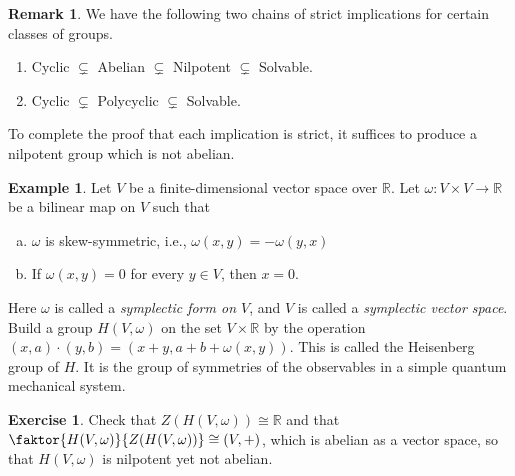 \documentclass[10pt,letterpaper,cm]{nupset}
\theoremstyle{definition}
\newtheorem{exmp}{Example}
\newtheorem{remark}{Remark}
\newtheorem{exercise}{Exercise}
\newcommand{\R}{\mathbb R}
\newcommand{\1}{\mathbf{1}}
\newcommand{\0}{\vec 0}
\begin{document}
\begin{remark} We have the following two chains of strict implications for certain classes of groups.
\begin{enumerate}
\item Cyclic $\subsetneq$ Abelian $\subsetneq$ Nilpotent $\subsetneq$ Solvable.
\item Cyclic $\subsetneq$ Polycyclic $\subsetneq$  Solvable.
\end{enumerate}
To complete the proof that each implication is strict, it suffices to produce a nilpotent group which is not abelian.

\end{remark}

\begin{exmp}
Let $V$ be a finite-dimensional vector space over $\R$. Let $\omega: V\times V\to \R$ be a bilinear map on $V$ such that
\begin{enumerate}[(a)]
\item $\omega$ is skew-symmetric, i.e., $\omega(x,y) = -\omega(y,x)$
\item If $\omega(x,y) =0$ for every $y \in V$, then $x=0$.
\end{enumerate}
Here $\omega$ is called a \textit{symplectic form on $V$}, and $V$ is called a \textit{symplectic vector space}. Build a group $H(V, \omega)$ on the set $V \times \R$ by the operation $(x,a)\cdot(y,b) = (x+y, a+b + \omega(x,y))$. This is called the Heisenberg group of $H$. It is the group of symmetries of the observables in a simple quantum mechanical system. 

\begin{exercise} 
Check that $Z(H(V, \omega)) \cong \R$ and that $\faktor{H(V, \omega)}{Z(H(V, \omega))} \cong (V, +)$, which is abelian as a vector space, so that $H(V, \omega)$ is nilpotent yet not abelian. 
\end{exercise}
\end{exmp}
\end{document}
